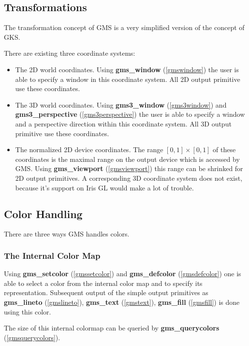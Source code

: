 \subsection{Transformations\label{tran}} 
The transformation concept of GMS is a very simplified version of
the concept of GKS.

There are existing three coordinate systems:
\begin{itemize}
\item The 2D world coordinates. Using 
{\bf gms\_window} (\ref{gmswindow}) 
the user is able to specify a window in this coordinate system.
All 2D output primitive use these coordinates.
\item The 3D world coordinates. Using 
{\bf gms3\_window} (\ref{gms3window}) and
{\bf gms3\_perspective} (\ref{gms3perspective}) 
the user is able to specify a window and a perspective
direction within this coordinate system.
All 3D output primitive use these coordinates.
 
\item The normalized 2D device  coordinates.
The range $ [0,1] \times [0,1] $ of these coordinates
is the maximal range on the output device which is
accessed by GMS. 
Using   
{\bf gms\_viewport} (\ref{gmsviewport})
this range can be shrinked for 2D output primitives.
A corresponding 3D coordinate system does not exist, 
because it's support on Iris GL would make a lot 
of trouble.
\end{itemize}





\subsection{Color Handling\label{Color}}There are three ways GMS handles colors.


\subsubsection{The Internal Color Map\label{defcolor}}Using 
{\bf gms\_setcolor} (\ref{gmssetcolor})
and
{\bf gms\_defcolor} (\ref{gmsdefcolor})
one is able to select a color from the internal color map
and to specify its representation. Subsequent output
of the simple output primitives 
as 
{\bf gms\_lineto} (\ref{gmslineto}),
{\bf gms\_text} (\ref{gmstext}),
{\bf gms\_fill} (\ref{gmsfill})
is done using this color.

The size of this internal colormap can be queried by 
{\bf gms\_querycolors} (\ref{gmsquerycolors}).









